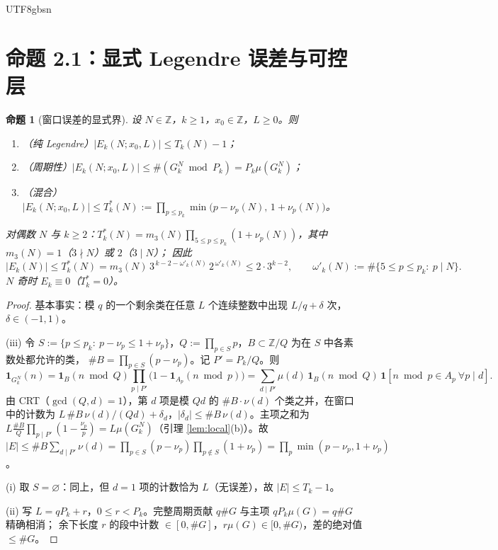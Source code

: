 \documentclass[11pt,a4paper]{article}
\newcommand{\Haar}{\mu}
\newcommand{\status}[1]{\par\noindent\fbox{\textbf{状态：#1}}\par\smallskip}
\newcommand{\Tleg}{T}                   %
\newcommand{\Tmix}{T^{*}}               %
\theoremstyle{plain}
\newtheorem{prop}{命题}[section]
\theoremstyle{definition}
\begin{document}
\begin{CJK}{UTF8}{gbsn}
\section{命题 2.1：显式 Legendre 误差与可控层}\label{sec:legendre}

\begin{prop}[窗口误差的显式界]\label{prop:legendre}
设 $N\in\mathbb Z$，$k\ge1$，$x_0\in\mathbb Z$，$L\ge0$。则
\begin{enumerate}[label=(\roman*)]
\item（纯 Legendre）$|E_k(N;x_0,L)|\le\Tleg_k(N)-1$；
\item（周期性）$|E_k(N;x_0,L)|\le\#(G_k^N\bmod P_k)=P_k\Haar(G_k^N)$；
\item（混合）$|E_k(N;x_0,L)|\le\Tmix_k(N):=\prod_{p\le p_k}\min\bigl(p-\nu_p(N),\,1+\nu_p(N)\bigr)$。
\end{enumerate}
对偶数 $N$ 与 $k\ge2$：$\Tmix_k(N)=m_3(N)\prod_{5\le p\le p_k}(1+\nu_p(N))$，其中 $m_3(N)=1$（$3\nmid N$）或 $2$（$3\mid N$）；
因此
\[
|E_k(N)|\le\Tmix_k(N)=m_3(N)\,3^{\,k-2-\omega'_k(N)}\,2^{\,\omega'_k(N)}\le2\cdot3^{k-2},\qquad
\omega'_k(N):=\#\{5\le p\le p_k:\ p\mid N\}.
\]
$N$ 奇时 $E_k\equiv0$（$\Tmix_k=0$）。
\end{prop}
\status{已证}
\begin{proof}
基本事实：模 $q$ 的一个剩余类在任意 $L$ 个连续整数中出现 $L/q+\delta$ 次，$\delta\in(-1,1)$。

(iii) 令 $S:=\{p\le p_k:\ p-\nu_p\le1+\nu_p\}$，$Q:=\prod_{p\in S}p$，$B\subset\mathbb Z/Q$ 为在 $S$ 中各素数处都允许的类，
$\#B=\prod_{p\in S}(p-\nu_p)$。记 $P'=P_k/Q$。则
\[
\mathbf 1_{G_k^N}(n)=\mathbf 1_B(n\bmod Q)\prod_{p\mid P'}\bigl(1-\mathbf 1_{A_p}(n\bmod p)\bigr)
=\sum_{d\mid P'}\mu(d)\,\mathbf 1_B(n\bmod Q)\,\mathbf 1[n\bmod p\in A_p\ \forall p\mid d].
\]
由 CRT（$\gcd(Q,d)=1$），第 $d$ 项是模 $Qd$ 的 $\#B\cdot\nu(d)$ 个类之并，在窗口中的计数为
$L\,\#B\,\nu(d)/(Qd)+\delta_d$，$|\delta_d|\le\#B\,\nu(d)$。主项之和为
$L\frac{\#B}{Q}\prod_{p\mid P'}(1-\frac{\nu_p}{p})=L\Haar(G_k^N)$（引理 \ref{lem:local}(b)）。故
$|E|\le\#B\sum_{d\mid P'}\nu(d)=\prod_{p\in S}(p-\nu_p)\prod_{p\notin S}(1+\nu_p)=\prod_p\min(p-\nu_p,1+\nu_p)$。

(i) 取 $S=\varnothing$：同上，但 $d=1$ 项的计数恰为 $L$（无误差），故 $|E|\le\Tleg_k-1$。

(ii) 写 $L=qP_k+r$，$0\le r<P_k$。完整周期贡献 $q\#G$ 与主项 $qP_k\Haar(G)=q\#G$ 精确相消；
余下长度 $r$ 的段中计数 $\in[0,\#G]$，$r\Haar(G)\in[0,\#G)$，差的绝对值 $\le\#G$。


\end{proof}
\end{CJK}
\end{document}
